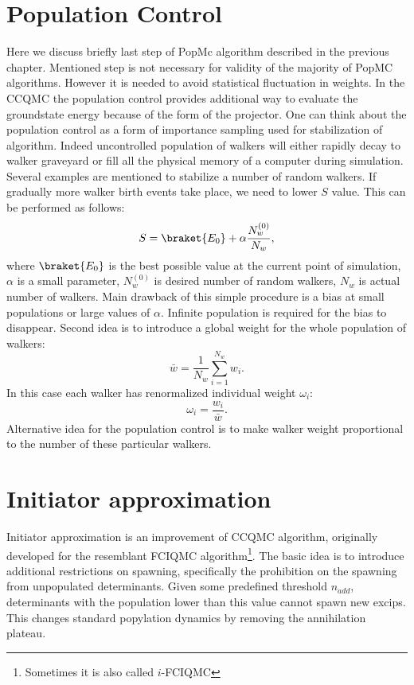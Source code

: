 \documentclass[twoside,english]{uiofysmaster}
\begin{document}
\section{Population Control}
Here we discuss briefly last step of PopMc algorithm described in the previous chapter. Mentioned step is not necessary for validity of the majority of PopMC algorithms. However it is needed to avoid statistical fluctuation in weights. In the CCQMC the population control provides additional way to evaluate the groundstate energy because of the form of the projector. One can think about the population control as a form of importance sampling used for stabilization of algorithm. Indeed uncontrolled population of walkers will either rapidly decay to walker graveyard or fill all the physical memory of a computer during simulation. Several examples are mentioned to stabilize a number of random walkers. If gradually more walker birth events take place, we need to lower $S$ value. This can be performed as follows:
\begin{equation}
S = \braket{E_0} + \alpha \frac{N_w^{(0)}}{N_w},
\end{equation}  
where $\braket{E_0}$ is the best possible value at the current point of simulation, $\alpha$ is a small parameter, $N_w^{(0)}$ is desired number of random walkers, $N_w$ is actual number of walkers. Main drawback of this simple procedure is a bias at small populations or large values of $\alpha$. Infinite population is required for the bias to disappear.
Second idea is to introduce a global weight for the whole population of walkers:
\begin{equation}
\bar{w} = \frac{1}{N_w}\sum_{i=1}^{N_w}w_i.
\end{equation}  
In this case each walker has renormalized individual weight $\omega_i$:
\begin{equation}
\omega_i = \frac{w_i}{\bar{w}}.
\end{equation}  
Alternative idea for the population control is to make walker weight proportional to the number of these particular walkers.

\section{Initiator approximation}

Initiator approximation is an improvement of CCQMC algorithm, originally developed for the resemblant FCIQMC algorithm\footnote{Sometimes it is also called $i$-FCIQMC}. The basic idea is to introduce additional restrictions on spawning, specifically the prohibition on the spawning from unpopulated determinants. Given some predefined threshold $n_{add}$, determinants with the population lower than this value cannot spawn new excips. This changes standard popylation dynamics by removing the annihilation plateau\cite{SpencerDevelopmentsstochasticcoupled2016}.  
\end{document}

